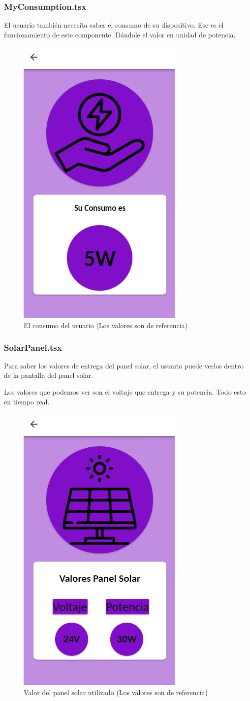                 \subsubsection{MyConsumption.tsx}
                    El usuario también necesita saber el consumo de su dispositivo. Ese es el funcionamiento de este componente. Dándole el valor en unidad de potencia.\par
    
                    \begin{figure} [H]
                        \centering
                        \includegraphics[width=0.25\linewidth]{Imagenes/Aplicación/Consumption.jpg}
                        \caption{El consumo del usuario (Los valores son de referencia)}
                        \label{fig:a5}
                    \end{figure}
                
                \subsubsection{SolarPanel.tsx}
                    Para saber los valores de entrega del panel solar, el usuario puede verlos dentro de la pantalla del panel solar.\par
                    Los valores que podemos ver son el voltaje que entrega y su potencia. Todo esto en tiempo real.\par
    
                    \begin{figure} [H]
                        \centering
                        \includegraphics[width=0.25\linewidth]{Imagenes/Aplicación/Value_Energy.jpg}
                        \caption{Valor del panel solar utilizado (Los valores son de referencia)}
                        \label{fig:a6}
                    \end{figure}
                
